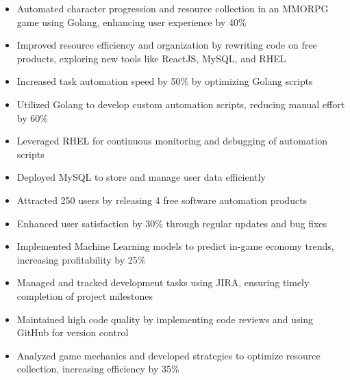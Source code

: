 \documentclass[a4paper,10pt]{article}
\begin{document}
\begin{itemize}[leftmargin=*,label=\textbullet]
  \item Automated character progression and resource collection in an MMORPG game using Golang, enhancing user experience by 40\%
  \item Improved resource efficiency and organization by rewriting code on free products, exploring new tools like ReactJS, MySQL, and RHEL
  \item Increased task automation speed by 50\% by optimizing Golang scripts
  \item Utilized Golang to develop custom automation scripts, reducing manual effort by 60\%
  \item Leveraged RHEL for continuous monitoring and debugging of automation scripts
  \item Deployed MySQL to store and manage user data efficiently
  \item Attracted 250 users by releasing 4 free software automation products
  \item Enhanced user satisfaction by 30\% through regular updates and bug fixes
  \item Implemented Machine Learning models to predict in-game economy trends, increasing profitability by 25\%
  \item Managed and tracked development tasks using JIRA, ensuring timely completion of project milestones
  \item Maintained high code quality by implementing code reviews and using GitHub for version control
  \item Analyzed game mechanics and developed strategies to optimize resource collection, increasing efficiency by 35\%
\end{itemize}
\vspace{10pt}
\end{document}
